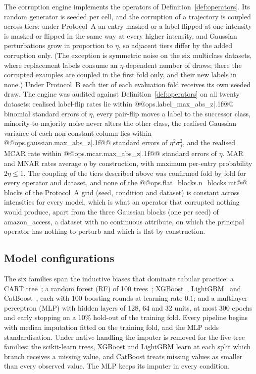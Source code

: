 \documentclass[pdflatex,sn-mathphys]{sn-jnl}
\theoremstyle{thmstyleone}
\theoremstyle{thmstyletwo}
\theoremstyle{thmstylethree}
\begin{document}
The corruption engine implements the operators of Definition~\ref{def:operators}. Its random generator is seeded per cell, and the corruption of a trajectory is coupled across tiers: under Protocol~A an entry masked or a label flipped at one intensity is masked or flipped in the same way at every higher intensity, and Gaussian perturbations grow in proportion to $\eta$, so adjacent tiers differ by the added corruption only. (The exception is symmetric noise on the six multiclass datasets, where replacement labels consume an $\eta$-dependent number of draws; there the corrupted examples are coupled in the first fold only, and their new labels in none.) Under Protocol~B each tier of each evaluation fold receives its own seeded draw. The engine was audited against Definition~\ref{def:operators} on all twenty datasets: realised label-flip rates lie within @@{ops.label_max_abs_z|.1f}@@ binomial standard errors of $\eta$, every pair-flip moves a label to the successor class, minority-to-majority noise never alters the other class, the realised Gaussian variance of each non-constant column lies within @@{ops.gaussian.max_abs_z|.1f}@@ standard errors of $\eta^{2}\sigma_j^{2}$, and the realised MCAR rate within @@{ops.mcar.max_abs_z|.1f}@@ standard errors of $\eta$. MAR and MNAR rates average $\eta$ by construction, with maximum per-entry probability $2\eta\le1$. The coupling of the tiers described above was confirmed fold by fold for every operator and dataset, and none of the @@{ops.flat_blocks.n_blocks|int}@@ blocks of the Protocol~A grid (seed, condition and dataset) is constant across intensities for every model, which is what an operator that corrupted nothing would produce, apart from the three Gaussian blocks (one per seed) of amazon\_access, a dataset with no continuous attribute, on which the principal operator has nothing to perturb and which is flat by construction.

\subsection{Model configurations}\label{sec:method:models}

The six families span the inductive biases that dominate tabular practice: a CART tree~\cite{breiman1984classification}; a random forest (RF) of 100 trees~\cite{breiman2001random}; XGBoost~\cite{chen2016xgboost}, LightGBM~\cite{ke2017lightgbm} and CatBoost~\cite{prokhorenkova2018catboost}, each with 100 boosting rounds at learning rate $0.1$; and a multilayer perceptron (MLP) with hidden layers of 128, 64 and 32 units, at most 300 epochs and early stopping on a 10\% hold-out of the training fold. Every pipeline begins with median imputation fitted on the training fold, and the MLP adds standardisation. Under native handling the imputer is removed for the five tree families: the scikit-learn trees, XGBoost and LightGBM learn at each split which branch receives a missing value, and CatBoost treats missing values as smaller than every observed value. The MLP keeps its imputer in every condition.
\end{document}
